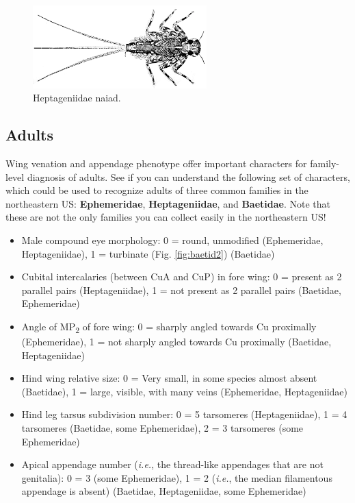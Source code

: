 \documentclass[letterpaper, 11pt]{article}
\begin{document}
\begin{figure}[ht!]
  \centering
    \includegraphics[width=0.6\textwidth]{heptageniidNaiad.png}
  \caption{Heptageniidae naiad. \citep[Modified from Fig. 360 in][]{bhlpart97188ephem}}
  \label{fig:heptageniidNaiad}
\end{figure}
\FloatBarrier

\subsection{Adults}
\noindent{}Wing venation and appendage phenotype offer important characters for family-level diagnosis of adults. See if you can understand the following set of characters, which could be used to recognize adults of three common families in the northeastern US: \textbf{Ephemeridae}, \textbf{Heptageniidae}, and \textbf{Baetidae}. Note that these are not the only families you can collect easily in the northeastern US!

\begin{itemize}
\item Male compound eye morphology: 0 = round, unmodified (Ephemeridae, Heptageniidae), 1 = turbinate (Fig. \ref{fig:baetid2}) (Baetidae)
\item Cubital intercalaries (between CuA and CuP) in fore wing: 0 = present as 2 parallel pairs (Heptageniidae), 1 = not present as 2 parallel pairs (Baetidae, Ephemeridae)
\item Angle of \texorpdfstring{MP\textsubscript{2}}{ }{ }of fore wing: 0 = sharply angled towards Cu proximally (Ephemeridae), 1 = not sharply angled towards Cu proximally (Baetidae, Heptageniidae)
\item Hind wing relative size: 0 = Very small, in some species almost absent (Baetidae), 1 = large, visible, with many veins (Ephemeridae, Heptageniidae)
\item Hind leg tarsus subdivision number: 0 = 5 tarsomeres (Heptageniidae), 1 = 4 tarsomeres (Baetidae, some Ephemeridae), 2 = 3 tarsomeres (some Ephemeridae)
\item Apical appendage number (\textit{i.e.}, the thread-like appendages that are not genitalia): 0 = 3 (some Ephemeridae), 1 = 2 (\textit{i.e.}, the median filamentous appendage is absent) (Baetidae, Heptageniidae, some Ephemeridae)
\end{itemize}
\end{document}
